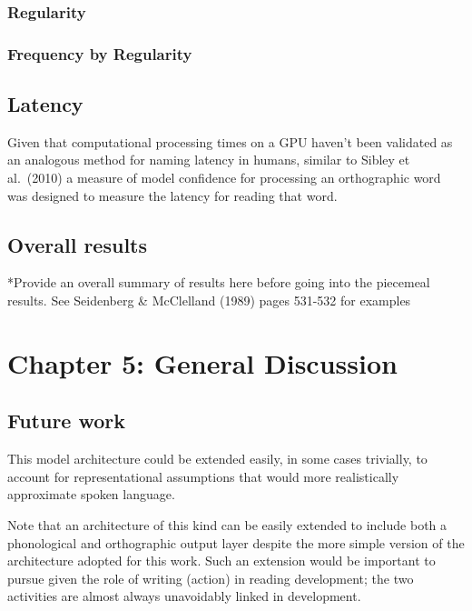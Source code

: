 \documentclass[
  american,
  man,floatsintext]{apa6}
\begin{document}
\hypertarget{regularity}{%
\subsubsection{Regularity}\label{regularity}}

\hypertarget{frequency-by-regularity}{%
\subsubsection{Frequency by Regularity}\label{frequency-by-regularity}}

\hypertarget{latency}{%
\subsection{Latency}\label{latency}}

Given that computational processing times on a GPU haven't been validated as an analogous method for naming latency in humans, similar to Sibley et al.~(2010) a measure of model confidence for processing an orthographic word was designed to measure the latency for reading that word.

\hypertarget{overall-results}{%
\subsection{Overall results}\label{overall-results}}

*Provide an overall summary of results here before going into the piecemeal results. See Seidenberg \& McClelland (1989) pages 531-532 for examples

\hypertarget{chapter-5-general-discussion}{%
\section{Chapter 5: General Discussion}\label{chapter-5-general-discussion}}

\hypertarget{future-work}{%
\subsection{Future work}\label{future-work}}

This model architecture could be extended easily, in some cases trivially, to account for representational assumptions that would more realistically approximate spoken language.

Note that an architecture of this kind can be easily extended to include both a phonological and orthographic output layer despite the more simple version of the architecture adopted for this work. Such an extension would be important to pursue given the role of writing (action) in reading development; the two activities are almost always unavoidably linked in development.
\end{document}
